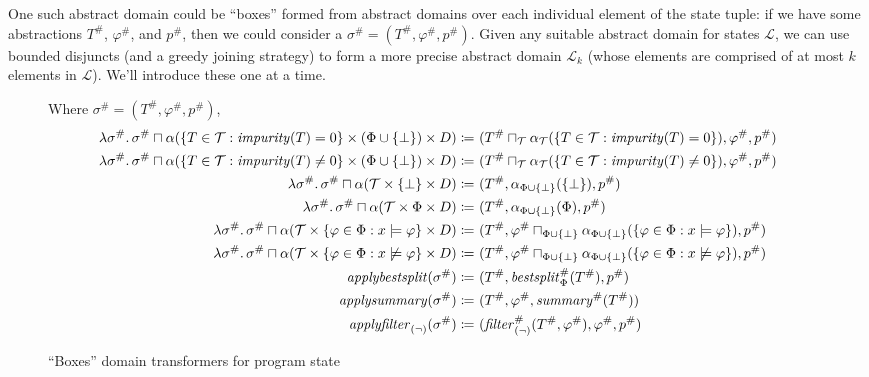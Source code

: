 One such abstract domain could be ``boxes'' formed from abstract domains
over each individual element of the state tuple:
if we have some abstractions $T^\#$, $\varphi^\#$, and $p^\#$,
then we could consider a $\sigma^\# = (T^\#, \varphi^\#, p^\#)$.
Given any suitable abstract domain for states $\mathcal{L}$,
we can use bounded disjuncts (and a greedy joining strategy)
to form a more precise abstract domain $\mathcal{L}_k$
(whose elements are comprised of at most $k$ elements in $\mathcal{L}$).
We'll introduce these one at a time.

\begin{figure}
\centering
Where $\sigma^\# = (T^\#, \varphi^\#, p^\#)$,
\begin{align*}
\lambda \sigma^\# \ldotp \sigma^\# \sqcap
\alpha(\{T \in \mathcal{T} : \mathit{impurity}(T) = 0\} \times (\Phi \cup \{\bot\}) \times D)
\coloneqq&~
(T^\# \sqcap_\mathcal{T} \alpha_\mathcal{T}(\{T \in \mathcal{T} : \mathit{impurity}(T) = 0\}),
\varphi^\#, p^\#) \\
%
\lambda \sigma^\# \ldotp \sigma^\# \sqcap
\alpha(\{T \in \mathcal{T} : \mathit{impurity}(T) \neq 0\} \times (\Phi \cup \{\bot\}) \times D)
\coloneqq&~
(T^\# \sqcap_\mathcal{T} \alpha_\mathcal{T}(\{T \in \mathcal{T} : \mathit{impurity}(T) \neq 0\}),
\varphi^\#, p^\#) \\
%
\lambda \sigma^\# \ldotp \sigma^\# \sqcap
\alpha(\mathcal{T} \times \{\bot\} \times D)
\coloneqq&~
(T^\#, \alpha_{\Phi\cup\{\bot\}}(\{\bot\}), p^\#) \\
%
\lambda \sigma^\# \ldotp \sigma^\# \sqcap
\alpha(\mathcal{T} \times \Phi \times D)
\coloneqq&~
(T^\#, \alpha_{\Phi\cup\{\bot\}}(\Phi), p^\#) \\
%
\lambda \sigma^\# \ldotp \sigma^\# \sqcap
\alpha(\mathcal{T} \times \{\varphi \in \Phi : x \models \varphi\} \times D)
\coloneqq&~
(T^\#, \varphi^\# \sqcap_{\Phi\cup\{\bot\}}
\alpha_{\Phi\cup\{\bot\}}(\{\varphi \in \Phi : x \models \varphi\}), p^\#) \\
%
\lambda \sigma^\# \ldotp \sigma^\# \sqcap
\alpha(\mathcal{T} \times \{\varphi \in \Phi : x \not\models \varphi\} \times D)
\coloneqq&~
(T^\#, \varphi^\# \sqcap_{\Phi\cup\{\bot\}}
\alpha_{\Phi\cup\{\bot\}}(\{\varphi \in \Phi : x \not\models \varphi\}), p^\#) \\
%
\mathit{applybestsplit}(\sigma^\#)
\coloneqq&~
(T^\#, \mathit{bestsplit}^\#_\Phi(T^\#), p^\#) \\
%
\mathit{applysummary}(\sigma^\#)
\coloneqq&~
(T^\#, \varphi^\#, \mathit{summary}^\#(T^\#)) \\
%
\mathit{applyfilter}_{(\lnot)}(\sigma^\#)
\coloneqq&~
(\mathit{filter}^\#_{(\lnot)}(T^\#, \varphi^\#), \varphi^\#, p^\#) \\
\end{align*}
\caption{``Boxes'' domain transformers for program state}
\label{fig:boxes}
\end{figure}


